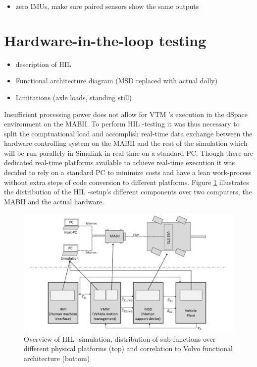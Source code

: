 \documentclass[ExampleMasters.tex]{subfiles}
\begin{document}
\begin{itemize}
	\item zero IMUs, make sure paired sensors show the same outputs
	
\end{itemize}

\section{Hardware-in-the-loop testing}
\label{sec:HIL}
\begin{itemize}
	\item description of \gls{HIL} 
	\item Functional architecture diagram (MSD replaced with actual dolly)
	\item Limitations (axle loads, standing still)
\end{itemize}

Insufficient processing power does not allow for \gls{VTM} 's execution in the dSpace environment on the \gls{MABII}. To perform \gls{HIL} -testing it was thus necessary to split the comptuational load and accomplish real-time data exchange between the hardware controlling system on the \gls{MABII} and the rest of the simulation which will be run parallely in Simulink in real-time on a standard PC. Though there are dedicated real-time platforms available to achieve real-time execution it was decided to rely on a standard PC to minimize costs and have a lean work-process without extra steps of code conversion to different platforms. Figure \ref{fig:HIL_overview} illustrates the distribution of the \gls{HIL} -setup's different components over two computers, the \gls{MABII} and the actual hardware. 

\begin{figure}[h]
	\centering
	\includegraphics[width=1\linewidth]{figures/HIL_overview}
	\caption{Overview of \gls{HIL} -simulation, distribution of sub-functions over different physical platforms (top) and correlation to Volvo functional architecture (bottom)}
	
	\label{fig:HIL_overview}
\end{figure}
\end{document}
